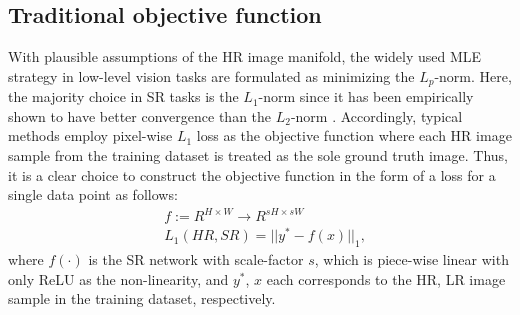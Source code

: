 \documentclass[letterpaper]{article} %
\begin{document}
\subsection{Traditional objective function}
With plausible assumptions of the HR image manifold, the widely used MLE strategy in low-level vision tasks are formulated as minimizing the $L_p$-norm.
Here, the majority choice in SR tasks is the $L_1$-norm since it has been empirically shown to have better convergence than the $L_2$-norm \cite{SISR2_EDSR}.
Accordingly, typical methods employ pixel-wise $L_1$ loss as the objective function where each HR image sample from the training dataset is treated as the sole ground truth image.
%
Thus, it is a clear choice to construct the objective function in the form of a loss for a single data point as follows:
%
\begin{equation}
    \begin{aligned}
        &f:=R^{H \times W} \rightarrow R^{sH \times sW} \\
        &L_1(HR, SR) = ||y^* - f(x)||_1,
    \end{aligned}
\end{equation}
where $f(\cdot)$ is the SR network with scale-factor $s$, which is piece-wise linear \cite{PiecewiseLinear} with only ReLU \cite{relu} as the non-linearity, and $y^*$, $x$ each corresponds to the HR, LR image sample in the training dataset, respectively.

\end{document}
